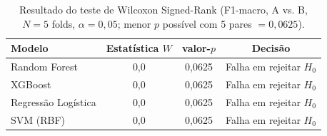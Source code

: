 \begin{table}[htbp]
  \centering
  \caption{Resultado do teste de Wilcoxon Signed-Rank (F1-macro, A vs. B, $N = 5$ folds, $\alpha = 0{,}05$; menor $p$ possível com 5 pares $= 0,0625$).}
  \label{tab:wilcoxon}
  \begin{tabular}{lccc}
    \toprule
    Modelo & Estatística $W$ & valor-$p$ & Decisão \\
    \midrule
    Random Forest & 0,0 & 0,0625 & Falha em rejeitar $H_0$ \\
    XGBoost & 0,0 & 0,0625 & Falha em rejeitar $H_0$ \\
    Regressão Logística & 0,0 & 0,0625 & Falha em rejeitar $H_0$ \\
    SVM (RBF) & 0,0 & 0,0625 & Falha em rejeitar $H_0$ \\
    \bottomrule
  \end{tabular}
\end{table}
